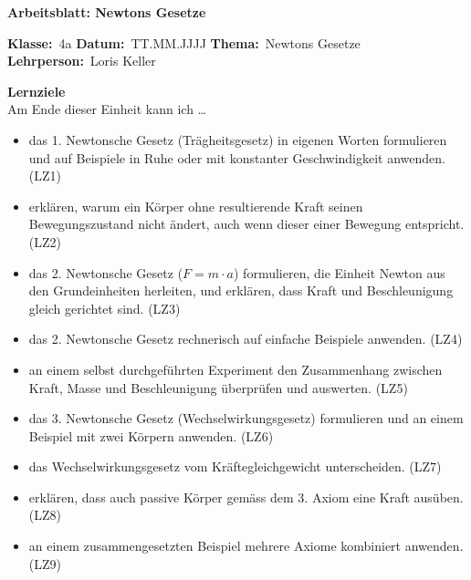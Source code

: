 \documentclass[addpoints,11pt,a4paper]{exam}
\newcommand{\Kopfzeile}[4]{%
  \begin{titlebox}
    {\color{white}\sffamily\bfseries\Large #4}
  \end{titlebox}
  \vspace{0.5em}
  \noindent\textbf{Klasse:}~#1 \hfill \textbf{Datum:}~#2 \hfill \textbf{Thema:}~#3
    \hfill \textbf{Lehrperson:}~Loris Keller
  \vspace{0.8em}
  \lhead{\textcolor{darkgray}{#3}}
  \rhead{\textcolor{darkgray}{#4}}
}
\newcommand{\Klasse}{4a}
\newcommand{\Datum}{TT.MM.JJJJ}
\newcommand{\Thema}{Newtons Gesetze}
\newcommand{\ArbeitsblattTitel}{Arbeitsblatt: Newtons Gesetze}
\begin{document}
\Kopfzeile{\Klasse}{\Datum}{\Thema}{\ArbeitsblattTitel}

\begin{infobox}
\textbf{Lernziele}\\
Am Ende dieser Einheit kann ich \dots
\begin{itemize}[leftmargin=1.2cm,itemsep=0.25em]
  \item das 1. Newtonsche Gesetz (Trägheitsgesetz) in eigenen Worten formulieren und auf Beispiele in Ruhe oder mit konstanter Geschwindigkeit anwenden. (LZ1)
  \item erklären, warum ein Körper ohne resultierende Kraft seinen Bewegungszustand nicht ändert, auch wenn dieser einer Bewegung entspricht. (LZ2)
  \item das 2. Newtonsche Gesetz ($F=m\cdot a$) formulieren, die Einheit Newton aus den Grundeinheiten herleiten, und erklären, dass Kraft und Beschleunigung gleich gerichtet sind. (LZ3)
  \item das 2. Newtonsche Gesetz rechnerisch auf einfache Beispiele anwenden. (LZ4)
  \item an einem selbst durchgeführten Experiment den Zusammenhang zwischen Kraft, Masse und Beschleunigung überprüfen und auswerten. (LZ5)
  \item das 3. Newtonsche Gesetz (Wechselwirkungsgesetz) formulieren und an einem Beispiel mit zwei Körpern anwenden. (LZ6)
  \item das Wechselwirkungsgesetz vom Kräftegleichgewicht unterscheiden. (LZ7)
  \item erklären, dass auch passive Körper gemäss dem 3. Axiom eine Kraft ausüben. (LZ8)
  \item an einem zusammengesetzten Beispiel mehrere Axiome kombiniert anwenden. (LZ9)
\end{itemize}
\end{infobox}
\end{document}
